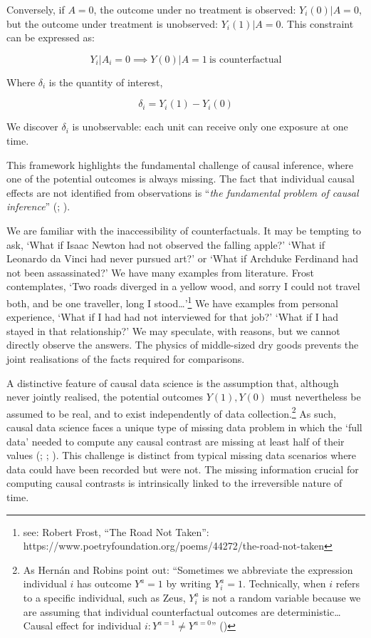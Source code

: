 \documentclass[
  singlecolumn,
  9pt]{article}
\begin{document}
Conversely, if \(A = 0\), the outcome under no treatment is observed:
\(Y_i(0)|A=0\), but the outcome under treatment is unobserved:
\(Y_i(1)|A=0\). This constraint can be expressed as:

\[
Y_i|A_i = 0 \implies Y(0)|A=1~ \text{is counterfactual} 
\]

Where \(\delta_i\) is the quantity of interest,

\[
\delta_i = Y_i(1) - Y_i(0)
\]

We discover \(\delta_i\) is unobservable: each unit can receive only one
exposure at one time.

This framework highlights the fundamental challenge of causal inference,
where one of the potential outcomes is always missing. The fact that
individual causal effects are not identified from observations is
``\emph{the fundamental problem of causal inference}''
(;
).

We are familiar with the inaccessibility of counterfactuals. It may be
tempting to ask, `What if Isaac Newton had not observed the falling
apple?' `What if Leonardo da Vinci had never pursued art?' or `What if
Archduke Ferdinand had not been assassinated?' We have many examples
from literature. Frost contemplates, `Two roads diverged in a yellow
wood, and sorry I could not travel both, and be one traveller, long I
stood\ldots{}'\footnote{see: Robert Frost, ``The Road Not Taken'':
  https://www.poetryfoundation.org/poems/44272/the-road-not-taken} We
have examples from personal experience, `What if I had had not
interviewed for that job?' `What if I had stayed in that relationship?'
We may speculate, with reasons, but we cannot directly observe the
answers. The physics of middle-sized dry goods prevents the joint
realisations of the facts required for comparisons.

A distinctive feature of causal data science is the assumption that,
although never jointly realised, the potential outcomes \(Y(1),Y(0)\)
must nevertheless be assumed to be real, and to exist independently of
data collection.\footnote{As Hernán and Robins point out: ``Sometimes we
  abbreviate the expression individual \(i\) has outcome \(Y^a = 1\) by
  writing \(Y^a_i = 1\). Technically, when \(i\) refers to a specific
  individual, such as Zeus, \(Y^a_i\) is not a random variable because
  we are assuming that individual counterfactual outcomes are
  deterministic\ldots{} Causal effect for individual
  \(i: Y^{a=1}\neq Y^{a=0}\)'' ()} As such, causal data science faces a unique type
of missing data problem in which the `full data' needed to compute any
causal contrast are missing at least half of their values
(;
;
). This
challenge is distinct from typical missing data scenarios where data
could have been recorded but were not. The missing information crucial
for computing causal contrasts is intrinsically linked to the
irreversible nature of time.
\end{document}
